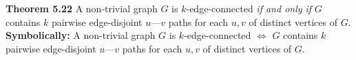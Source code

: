 \nopagenumbers
{\bf Theorem 5.22}
\vskip 6pt
A non-trivial graph $G$ is $k$-edge-connected {\it if and only if} $G$ contains $k$ pairwise edge-disjoint $u$---$v$ paths for each $u,v$ of distinct vertices of $G$.
\vskip 10pt
{\bf Symbolically:}
A non-trivial graph $G$ is $k$-edge-connected $\Leftrightarrow$ $G$ contains $k$ pairwise edge-disjoint $u$---$v$ paths for each $u,v$ of distinct vertices of $G$.

\vfill\eject
